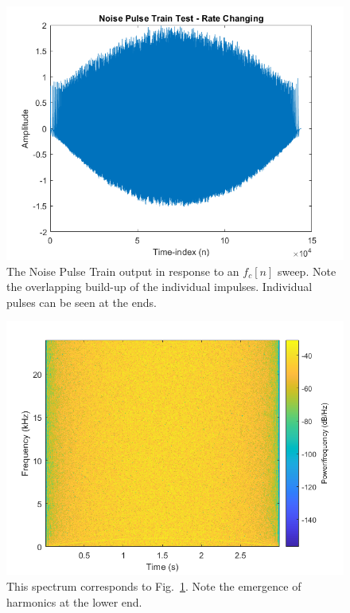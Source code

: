\documentclass[../main.tex]{subfiles}
\begin{document}
\begin{figure}[h!]
    \centering
    \includegraphics[scale=.60]{./images/plots/NPTTest2.png}
    \caption{The Noise Pulse Train output in response to an $f_c[n]$ sweep. Note the overlapping build-up of the individual impulses. Individual pulses can be seen at the ends.}
    \label{fig:NPTT2}
\end{figure}

\begin{figure}[h!]
    \centering
    \includegraphics[scale=.60]{./images/plots/NPTTest2Spectrum.png}
    \caption{This spectrum corresponds to Fig.~\ref{fig:NPTT2}. Note the emergence of harmonics at the lower end.}
    \label{fig:NPTT2Spec}
\end{figure}
\end{document}
